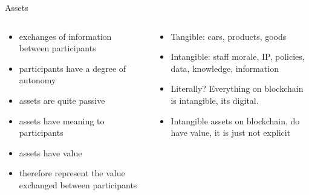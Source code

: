 \documentclass[pdf,table]{beamer}
\begin{document}
\begin{frame}{Assets}
	\begin{columns}[T]
		\begin{column}{0.48\textwidth}
			\begin{itemize}
				\item exchanges of information between participants
				\item participants have a degree of autonomy
				\item assets are quite passive
				\item assets have meaning to participants
				\item assets have value
				\item therefore represent the value exchanged between participants

			\end{itemize}
		\end{column}
		\begin{column}{0.48\textwidth}
			\begin{itemize}
				\item Tangible: cars, products, goods
				\item Intangible: staff morale, IP, policies, data, knowledge, information
				\item Literally? Everything on blockchain is intangible, its digital.
				\item Intangible assets on blockchain, do have value, it is just not explicit

			\end{itemize}
		\end{column}
	\end{columns}	
\end{frame}
\end{document}
